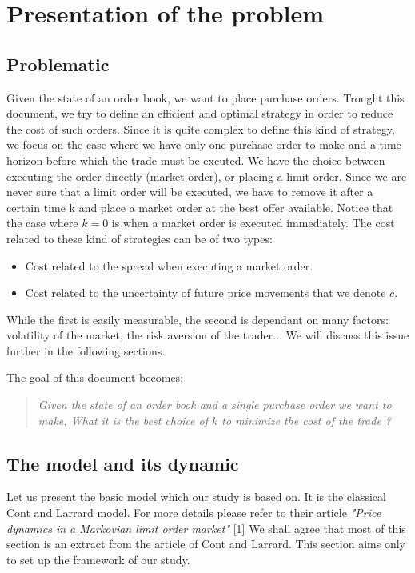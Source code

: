 \documentclass{article}
\begin{document}
\tableofcontents

\section{Presentation of the problem}

\subsection{Problematic}
Given the state of an order book, we want to place purchase orders. Trought this document, we try to define an efficient and optimal strategy in order to reduce the cost of such orders. Since it is quite complex to define this kind of strategy, we focus on the case where we have only one purchase order to make and a time horizon before which the trade must be excuted. We have the choice between executing the order directly (market order), or placing a limit order. Since we are never sure that a limit order will be executed, we have to remove it after a certain time k and place a market order at the best offer available. Notice that the case where $k = 0$ is when a market order is executed immediately.
The cost related to these kind of strategies can be of two types:

\begin{itemize}
	\item Cost related to the spread when executing a market order.
	\item Cost related to the uncertainty of future price movements that we denote $c$.
\end{itemize}
While the first is easily measurable, the second is dependant on many factors: volatility of the market, the risk aversion of the trader... 
We will discuss this issue further in the following sections.

The goal of this document becomes:
\begin{quote}
\textit{Given the state of an order book and a single purchase order we want to make, What it is the best choice of $k$ to minimize the cost of the trade  ?}
\end{quote}


\subsection{The model and its dynamic}
Let us present the basic model which our study is based on. It is the classical Cont and Larrard model. For more details please refer to their article \textit{"Price dynamics in a Markovian limit order market"} [1]
\newline
We shall agree that most of this section is an extract from the article of Cont and Larrard. This section aims only to set up the framework of our study.
\end{document}
